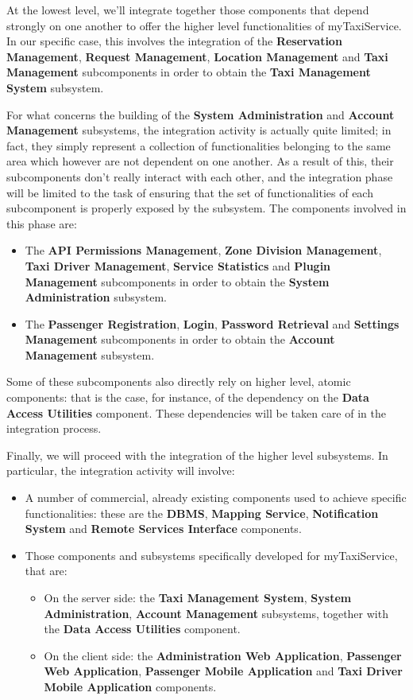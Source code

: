 At the lowest level, we'll integrate together those components that depend strongly on one another to offer the higher level functionalities of myTaxiService. In our specific case, this involves the integration of the \textbf{Reservation Management}, \textbf{Request Management}, \textbf{Location Management} and \textbf{Taxi Management} subcomponents in order to obtain the \textbf{Taxi Management System} subsystem. 

For what concerns the building of the \textbf{System Administration} and \textbf{Account Management} subsystems, the integration activity is actually quite limited; in fact, they simply represent a collection of functionalities belonging to the same area which however are not dependent on one another. As a result of this, their subcomponents don't really interact with each other, and the integration phase will be limited to the task of ensuring that the set of functionalities of each subcomponent is properly exposed by the subsystem. The components involved in this phase are:
\begin{itemize}
	\item The \textbf{API Permissions Management}, \textbf{Zone Division Management}, \textbf{Taxi Driver Management}, \textbf{Service Statistics} and \textbf{Plugin Management} subcomponents in order to obtain the \textbf{System Administration} subsystem.
	\item The \textbf{Passenger Registration}, \textbf{Login}, \textbf{Password Retrieval} and \textbf{Settings Management} subcomponents in order to obtain the \textbf{Account Management} subsystem.
\end{itemize}

Some of these subcomponents also directly rely on higher level, atomic components: that is the case, for instance, of the dependency on the \textbf{Data Access Utilities} component. These dependencies will be taken care of in the integration process.

Finally, we will proceed with the integration of the higher level subsystems. In particular, the integration activity will involve:
\begin{itemize}
	\item A number of commercial, already existing components used to achieve specific functionalities: these are the \textbf{DBMS}, \textbf{Mapping Service}, \textbf{Notification System} and \textbf{Remote Services Interface} components.
	\item Those components and subsystems specifically developed for myTaxiService, that are:
		\begin{itemize}
		\item On the server side: the \textbf{Taxi Management System}, \textbf{System Administration}, \textbf{Account Management} subsystems, together with the \textbf{Data Access Utilities} component.
		\item On the client side: the \textbf{Administration Web Application}, \textbf{Passenger Web Application}, \textbf{Passenger Mobile Application} and \textbf{Taxi Driver Mobile Application} components.
		\end{itemize}
\end{itemize}
 
